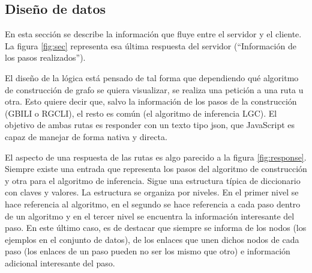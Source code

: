 \subsection{Diseño de datos}

En esta sección se describe la información que fluye entre el servidor y el cliente. La figura \ref{fig:sec} representa esa última respuesta del servidor (``Información de los pasos realizados'').

El diseño de la lógica está pensado de tal forma que dependiendo qué algoritmo de construcción de grafo se quiera visualizar, se realiza una petición a una ruta u otra. Esto quiere decir que, salvo la información de los pasos de la construcción (GBILI o RGCLI), el resto es común (el algoritmo de inferencia LGC). El objetivo de ambas rutas es responder con un texto tipo \Gls{json}, que JavaScript es capaz de manejar de forma nativa y directa.




El aspecto de una respuesta de las rutas es algo parecido a la figura \ref{fig:response}. Siempre existe una entrada que representa los pasos del algoritmo de construcción y otra para el algoritmo de inferencia. Sigue una estructura típica de diccionario con claves y valores. La estructura se organiza por niveles. En el primer nivel se hace referencia al algoritmo, en el segundo se hace referencia a cada paso dentro de un algoritmo y en el tercer nivel se encuentra la información interesante del paso.
En este último caso, es de destacar que siempre se informa de los nodos (los ejemplos en el conjunto de datos), de los enlaces que unen dichos nodos de cada paso (los enlaces de un paso pueden no ser los mismo que otro) e información adicional interesante del paso.

